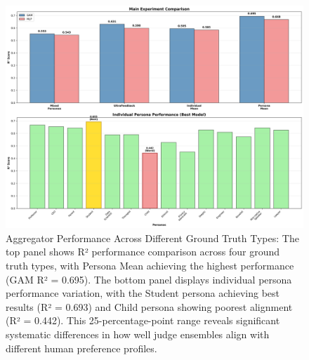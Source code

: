 \begin{figure}[htbp]
    \centering
    \includegraphics[width=\textwidth]{experiments/2b_aggregator_validation/experiment_results_full/plots/4_extended_comparison.png}
    \caption{Aggregator Performance Across Different Ground Truth Types: The top panel shows R² performance comparison across four ground truth types, with Persona Mean achieving the highest performance (GAM R² = 0.695). The bottom panel displays individual persona performance variation, with the Student persona achieving best results (R² = 0.693) and Child persona showing poorest alignment (R² = 0.442). This 25-percentage-point range reveals significant systematic differences in how well judge ensembles align with different human preference profiles.}
    \label{fig:variance_analysis_main}
\end{figure}


